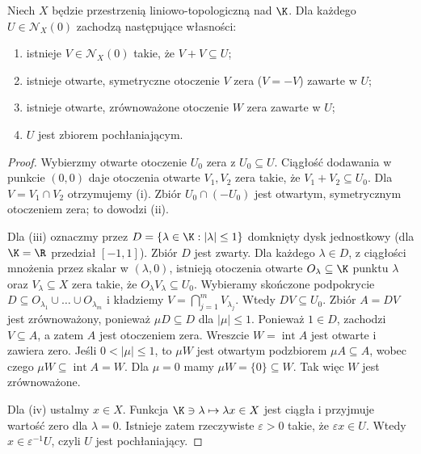 \begin{twierdzenie}\label{thm:zero-neighborhoods}
Niech $X$ będzie przestrzenią liniowo-topologiczną nad $\K$.
Dla każdego $U\in\mathcal N_X(0)$ zachodzą następujące własności:
\begin{enumerate}[label=\textup{(\roman*)}]
 \item istnieje $V\in\mathcal N_X(0)$ takie, że $V+V\subseteq U$;
 \item istnieje otwarte, symetryczne otoczenie $V$ zera
       ($V=-V$) zawarte w $U$;
 \item istnieje otwarte, zrównoważone otoczenie $W$ zera
       zawarte w $U$;
 \item $U$ jest zbiorem pochłaniającym.
\end{enumerate}
\end{twierdzenie}
\begin{proof}
Wybierzmy otwarte otoczenie $U_0$ zera z $U_0\subseteq U$.
Ciągłość dodawania w punkcie $(0,0)$ daje otoczenia otwarte
$V_1,V_2$ zera takie, że $V_1+V_2\subseteq U_0$.
Dla $V=V_1\cap V_2$ otrzymujemy (i). Zbiór
$U_0\cap(-U_0)$ jest otwartym, symetrycznym otoczeniem zera;
to dowodzi (ii).

Dla (iii) oznaczmy przez $D=\{\lambda\in\K:|\lambda|\leq1\}$
domknięty dysk jednostkowy (dla $\K=\R$ przedział $[-1,1]$).
Zbiór $D$ jest zwarty. Dla każdego $\lambda\in D$, z ciągłości
mnożenia przez skalar w $(\lambda,0)$, istnieją otoczenia otwarte
$O_\lambda\subseteq\K$ punktu $\lambda$ oraz $V_\lambda\subseteq X$
zera takie, że $O_\lambda V_\lambda\subseteq U_0$.
Wybieramy skończone podpokrycie
$D\subseteq O_{\lambda_1}\cup\dots\cup O_{\lambda_m}$ i kładziemy
$V=\bigcap_{j=1}^m V_{\lambda_j}$. Wtedy $DV\subseteq U_0$.
Zbiór $A=DV$ jest zrównoważony, ponieważ $\mu D\subseteq D$
dla $|\mu|\leq1$. Ponieważ $1\in D$, zachodzi $V\subseteq A$,
a zatem $A$ jest otoczeniem zera. Wreszcie $W=\operatorname{int}A$
jest otwarte i zawiera zero. Jeśli $0<|\mu|\leq1$, to
$\mu W$ jest otwartym podzbiorem $\mu A\subseteq A$, wobec czego
$\mu W\subseteq\operatorname{int}A=W$. Dla $\mu=0$ mamy
$\mu W=\{0\}\subseteq W$. Tak więc $W$ jest zrównoważone.

Dla (iv) ustalmy $x\in X$. Funkcja
$\K\ni\lambda\mapsto\lambda x\in X$ jest ciągła i przyjmuje
wartość zero dla $\lambda=0$. Istnieje zatem rzeczywiste
$\varepsilon>0$ takie, że $\varepsilon x\in U$.
Wtedy $x\in\varepsilon^{-1}U$, czyli $U$ jest pochłaniający.
\end{proof}

